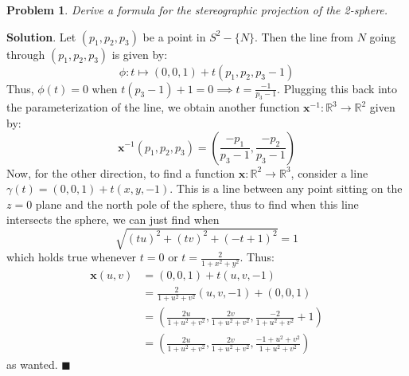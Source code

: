 \documentclass[12pt]{article}
\renewcommand{\=}[1]{\stackrel{#1}{=}} %
\providecommand{\RR}{\mathbb{R}}
\newtheorem{p}{Problem}[section]
\theoremstyle{definition}
\newenvironment{s}{%
        \begin{trivlist} \item \textbf{Solution}. }{%
            \hspace*{\fill} $\blacksquare$\end{trivlist}}%
\begin{document}
\begin{p}
    Derive a formula for the stereographic projection of the 2-sphere.
\end{p}
\begin{s}
    Let $(p_1,p_2,p_3)$ be a point in $S^2-\{N\}$. Then the line from $N$ going through $(p_1,p_2,p_3)$ is given by:
    \[ \phi: t \mapsto (0,0,1) + t(p_1,p_2,p_3-1) \]
    Thus, $\phi(t) = 0$ when $t(p_3 - 1) + 1 = 0 \implies t = \frac{-1}{p_3-1}$. Plugging this back into the parameterization of the line, we obtain
    another function $\mathbf{x}^{-1}: \RR^3 \to \RR^2$ given by:
    \[ \mathbf{x}^{-1}(p_1,p_2,p_3) = (\frac{-p_1}{p_3-1}, \frac{-p_2}{p_3-1}) \]
    Now, for the other direction, to find a function $\mathbf{x}: \RR^2 \to \RR^3$, consider a line $\gamma(t) = (0,0,1) + t(x,y,-1)$. This is a line
    between any point sitting on the $z=0$ plane and the north pole of the sphere, thus to find when this line intersects the sphere, we can just find when
    \[ \sqrt{(tu)^2 + (tv)^2 + (-t+1)^2} = 1 \]
    which holds true whenever $t = 0$ or $t = \frac{2}{1+x^2+y^2}$. Thus:
    \begin{align*}
        \mathbf{x}(u,v) &= (0,0,1) + t(u,v,-1) \\
        &= \frac{2}{1+u^2+v^2}(u,v,-1) + (0,0,1) \\
        &= (\frac{2u}{1+u^2+v^2}, \frac{2v}{1+u^2+v^2}, \frac{-2}{1+u^2+v^2} + 1) \\
        &= (\frac{2u}{1+u^2+v^2}, \frac{2v}{1+u^2+v^2}, \frac{-1+u^2+v^2}{1+u^2+v^2})
    \end{align*}
    as wanted.
\end{s}
\end{document}
